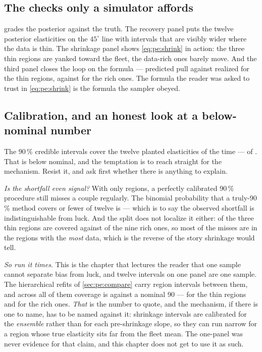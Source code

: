 \subsection*{The checks only a simulator affords}



 grades the posterior against the truth. The recovery panel puts the twelve
posterior elasticities on the $45^\circ$ line with intervals that are visibly wider where the data
is thin. The shrinkage panel shows \cref{eq:pe:shrink} in action: the three thin regions are yanked
toward the fleet, the data-rich ones barely move. And the third panel closes the loop on the
formula --- predicted pull \nbThreeShrinkPredThin{} against realized \nbThreeShrinkRealThin{} for
the thin regions, \nbThreeShrinkPredRich{} against \nbThreeShrinkRealRich{} for the rich ones. The
formula the reader was asked to trust in \cref{eq:pe:shrink} is the formula the sampler obeyed.

\subsection*{Calibration, and an honest look at a below-nominal number}

The 90\,\% credible intervals cover the twelve planted elasticities \pc{\nbThreeCover} of the time
--- \nbThreeCoverHits{} of \nbThreeNRegions. That is below nominal, and the temptation is to reach
straight for the mechanism. Resist it, and ask first whether there is anything to explain.

\emph{Is the shortfall even signal?} With only \nbThreeNRegions{} regions, a perfectly calibrated
90\,\% procedure still misses a couple regularly. The binomial probability that a truly-90\,\%
method covers \nbThreeCoverHits{} or fewer of twelve is \nbThreePAsbad{} --- which is to say the
observed shortfall is indistinguishable from luck. And the split does not localize it either:
\nbThreeCoverThin{} of the three thin regions are covered against \nbThreeCoverRich{} of the nine
rich ones, so most of the misses are in the regions with the \emph{most} data, which is the reverse
of the story shrinkage would tell.

\emph{So run it \nbThreeNseed{} times.} This is the chapter that lectures the reader that one sample
cannot separate bias from luck, and twelve intervals on one panel are one sample. The
\nbThreeNseed{} hierarchical refits of \cref{sec:pe:compare} carry \nbThreeNIntMulti{} region
intervals between them, and across all of them coverage is \pc{\nbThreeCoverMulti} against a nominal
90 --- \pc{\nbThreeCoverMultiThin} for the thin regions and \pc{\nbThreeCoverMultiRich} for the rich
ones. \emph{That} is the number to quote, and the mechanism, if there is one to name, has to be
named against it: shrinkage intervals are calibrated for the \emph{ensemble} rather than for each
pre-shrinkage slope, so they can run narrow for a region whose true elasticity sits far from the
fleet mean. The one-panel \pc{\nbThreeCover} was never evidence for that claim, and this chapter
does not get to use it as such.

